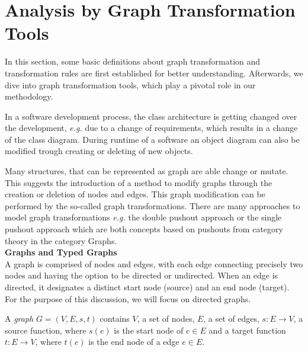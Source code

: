 \section{Analysis by Graph Transformation Tools}\label{gts}
In this section, some basic definitions about graph transformation and transformation rules are first established for better understanding. Afterwards, we dive into graph transformation tools, which play a pivotal role in our methodology. 

In a software development process, the class architecture is getting changed over the development, \emph{e.g.} due to a change of requirements, which results in a change of the class diagram. During runtime of a software an object diagram can also be modified trough creating or deleting of new objects. 

Many structures, that can be represented as graph are able change or mutate. This suggests the introduction of a method to modify graphs through the creation or deletion of nodes and edges. This graph modification can be performed by the so-called graph transformations. There are many approaches to model graph transformations \emph{e.g.} the double pushout approach or the single pushout approach which are both concepts based on pushouts from category theory in the category Graphs.\\ 
\textbf{Graphs and Typed Graphs}\\ 
A graph is comprised of nodes and edges, with each edge connecting precisely two nodes and having the option to be directed or undirected. When an edge is directed, it designates a distinct start node (source) and an end node (target). For the purpose of this discussion, we will focus on directed graphs.

\begin{definition}
\label{def_graph}
A \emph{graph} $G = (V,E,s,t)$ contains $V$, a set of nodes, $E$, a set of edges, $s: E \to V$, a source function, where $s(e)$ is the start node of $e \in E$ and a target function $t:E \to V$, where $t(e)$ is the end node of a edge $e \in E$.
\end{definition}

